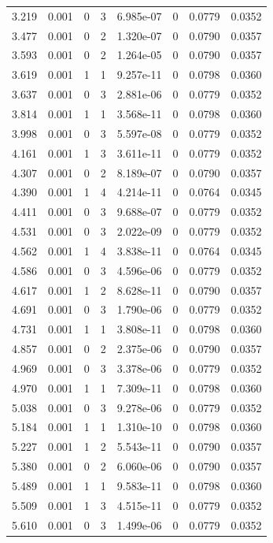 \documentclass[preview]{standalone}
\begin{document}
{{\begin{tabular}{L{1.2cm}C{1.2cm} C{0.3cm}C{0.5cm} C{1.4cm}C{1.4cm} C{1.4cm}C{1.4cm}}
  3.219  &  0.001  & 0     &  3 &  6.985e-07  & 0  & 0.0779 &  0.0352   \\ 
  3.477  &  0.001  & 0     &  2 &  1.320e-07  & 0  & 0.0790 &  0.0357   \\ 
  3.593  &  0.001  & 0     &  2 &  1.264e-05  & 0  & 0.0790 &  0.0357   \\ 
  3.619  &  0.001  & 1     &  1 &  9.257e-11  & 0  & 0.0798 &  0.0360   \\ 
  3.637  &  0.001  & 0     &  3 &  2.881e-06  & 0  & 0.0779 &  0.0352   \\ 
  3.814  &  0.001  & 1     &  1 &  3.568e-11  & 0  & 0.0798 &  0.0360   \\ 
  3.998  &  0.001  & 0     &  3 &  5.597e-08  & 0  & 0.0779 &  0.0352   \\ 
  4.161  &  0.001  & 1     &  3 &  3.611e-11  & 0  & 0.0779 &  0.0352   \\ 
  4.307  &  0.001  & 0     &  2 &  8.189e-07  & 0  & 0.0790 &  0.0357   \\ 
  4.390  &  0.001  & 1     &  4 &  4.214e-11  & 0  & 0.0764 &  0.0345   \\ 
  4.411  &  0.001  & 0     &  3 &  9.688e-07  & 0  & 0.0779 &  0.0352   \\ 
  4.531  &  0.001  & 0     &  3 &  2.022e-09  & 0  & 0.0779 &  0.0352   \\ 
  4.562  &  0.001  & 1     &  4 &  3.838e-11  & 0  & 0.0764 &  0.0345   \\ 
  4.586  &  0.001  & 0     &  3 &  4.596e-06  & 0  & 0.0779 &  0.0352   \\ 
  4.617  &  0.001  & 1     &  2 &  8.628e-11  & 0  & 0.0790 &  0.0357   \\ 
  4.691  &  0.001  & 0     &  3 &  1.790e-06  & 0  & 0.0779 &  0.0352   \\ 
  4.731  &  0.001  & 1     &  1 &  3.808e-11  & 0  & 0.0798 &  0.0360   \\ 
  4.857  &  0.001  & 0     &  2 &  2.375e-06  & 0  & 0.0790 &  0.0357   \\ 
  4.969  &  0.001  & 0     &  3 &  3.378e-06  & 0  & 0.0779 &  0.0352   \\ 
  4.970  &  0.001  & 1     &  1 &  7.309e-11  & 0  & 0.0798 &  0.0360   \\ 
  5.038  &  0.001  & 0     &  3 &  9.278e-06  & 0  & 0.0779 &  0.0352   \\ 
  5.184  &  0.001  & 1     &  1 &  1.310e-10  & 0  & 0.0798 &  0.0360   \\ 
  5.227  &  0.001  & 1     &  2 &  5.543e-11  & 0  & 0.0790 &  0.0357   \\ 
  5.380  &  0.001  & 0     &  2 &  6.060e-06  & 0  & 0.0790 &  0.0357   \\ 
  5.489  &  0.001  & 1     &  1 &  9.583e-11  & 0  & 0.0798 &  0.0360   \\ 
  5.509  &  0.001  & 1     &  3 &  4.515e-11  & 0  & 0.0779 &  0.0352   \\ 
  5.610  &  0.001  & 0     &  3 &  1.499e-06  & 0  & 0.0779 &  0.0352   \\ 
\hline 
\end{tabular} 

}}
\end{document}
